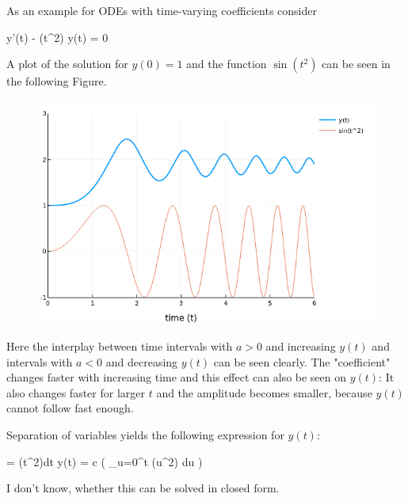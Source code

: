As an example for ODEs with time-varying coefficients consider

\bee
y'(t) - \sin(t^2) y(t) = 0
\eee

A plot of the solution for $y(0) = 1$ and the function $\sin(t^2)$ can be seen in the following Figure.

\begin{figure}[H]
	\includegraphics[scale=0.5]{images/ode_01_05.png}
\end{figure}

Here the interplay between time intervals with $a>0$ and increasing $y(t)$ and intervals with $a<0$ and decreasing $y(t)$ can be seen clearly. The "coefficient" changes faster with increasing time and this effect can also be seen on $y(t)$: It also changes faster for larger $t$ and the amplitude becomes smaller, because $y(t)$ cannot follow fast enough.

Separation of variables yields the following expression for $y(t)$:

\bee
{} = \sin(t^2)dt \rightarrow y(t) = c \exp \left( \int_{u=0}^t \sin(u^2) du \right)
\eee

I don't know, whether this can be solved in closed form.